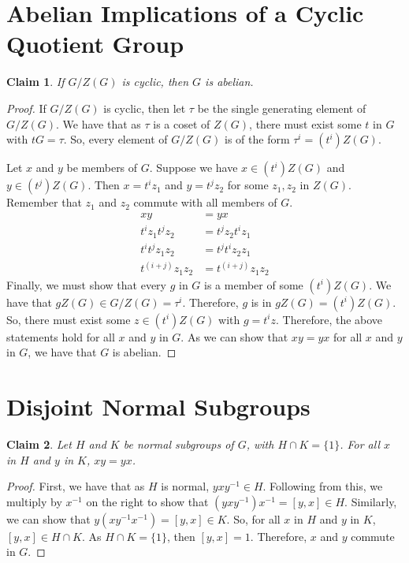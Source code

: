 \documentclass[12pt]{article}
\newtheorem*{claim*}{Claim}
\newcommand*{\inv}{^{-1}}
\begin{document}
\section{Abelian Implications of a Cyclic Quotient Group}
\begin{claim*}
If $G / Z(G)$ is cyclic, then $G$ is abelian.
\end{claim*}
\begin{proof}
If $G/Z(G)$ is cyclic, then let $\tau$ be the single generating element of $G / Z(G)$. We have that as $\tau$ is a coset of $Z(G)$, there must exist some $t$ in $G$ with $tG = \tau$. So, every element of $G / Z(G)$ is of the form $\tau^i = (t^i)Z(G)$. 

Let $x$ and $y$ be members of $G$. Suppose we have $x \in (t^i)Z(G)$ and $y \in (t^j)Z(G)$. Then $x = t^i z_1$ and $y = t^j z_2$ for some $z_1, z_2$ in $Z(G)$. Remember that $z_1$ and $z_2$ commute with all members of $G$.
\begin{align*}
xy &= yx\\
t^i z_1 t^j z_2 &= t^j z_2 t^i z_1\\
t^i t^j z_1 z_2 &= t^j t^i z_2 z_1\\
t^{(i + j)} z_1 z_2 &= t^{(i + j)} z_1 z_2
\end{align*}
Finally, we must show that every $g$ in $G$ is a member of some $(t^i)Z(G)$. We have that $gZ(G) \in G/Z(G) = \tau ^ i$. Therefore, $g$ is in $gZ(G) = (t^i)Z(G)$. So, there must exist some $z \in (t^i)Z(G)$ with $g = t^i z$. Therefore, the above statements hold for all $x$ and $y$ in $G$. As we can show that $xy = yx$ for all $x$ and $y$ in $G$, we have that $G$ is abelian.
\end{proof}

\section{Disjoint Normal Subgroups}
\begin{claim*}
Let $H$ and $K$ be normal subgroups of $G$, with $H \cap K = \{1\}$. For all $x$ in $H$ and $y$ in $K$, $xy = yx$.
\end{claim*}
\begin{proof}
First, we have that as $H$ is normal, $y x y\inv \in H$. Following from this, we multiply by $x\inv$ on the right to show that $(y x y\inv) x\inv = [y, x] \in H$. Similarly, we can show that $ y (x y\inv x\inv) = [y, x] \in K$. So, for all $x$ in $H$ and $y$ in $K$, $[y, x] \in H \cap K$. As $H \cap K = \{1\}$, then $[y,x] = 1$. Therefore, $x$ and $y$ commute in $G$. 
\end{proof}
\end{document}
